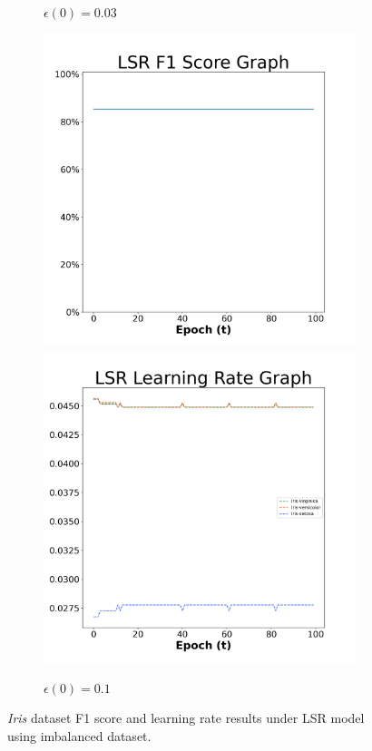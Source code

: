 \begin{figure}[H]
\begin{subfigure}{0.3\textwidth}
  \caption{$\epsilon(0)=0.03$}
\end{subfigure}\hfil %
\begin{subfigure}{0.3\textwidth}
  \includegraphics[width=\linewidth]{images/exper2/iris/LSR_0.1_f1.png}
  \includegraphics[width=\linewidth]{images/exper2/iris/LSR_0.1_lr.png}
  \caption{$\epsilon(0)=0.1$}
\end{subfigure}

\caption{\textit{Iris} dataset F1 score and learning rate results under LSR model using imbalanced dataset.}
\end{figure}

